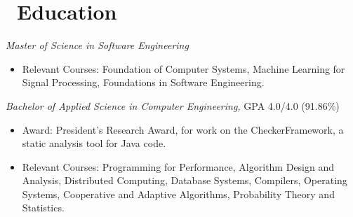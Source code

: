 \documentclass{resume}
\begin{document}
\section{\faGraduationCap\ Education}
 {
  \fontsize{10.5pt}{2}\selectfont
  \textit{Master of Science in Software Engineering}
  \begin{itemize}
    \item {Relevant Courses: Foundation of Computer Systems, Machine Learning for Signal Processing, Foundations in Software Engineering.}
  \end{itemize}


  \textit{Bachelor of Applied Science in Computer Engineering,} GPA 4.0/4.0 (91.86\%)
  \begin{itemize}
    \item {Award: President's Research Award, for work on the CheckerFramework, a static analysis tool for Java code.}
    \item {Relevant Courses: Programming for Performance, Algorithm Design and Analysis, Distributed Computing, Database Systems, Compilers, Operating Systems, Cooperative and Adaptive Algorithms, Probability Theory and Statistics.}
  \end{itemize}
  \par
 }



%
%
\end{document}
